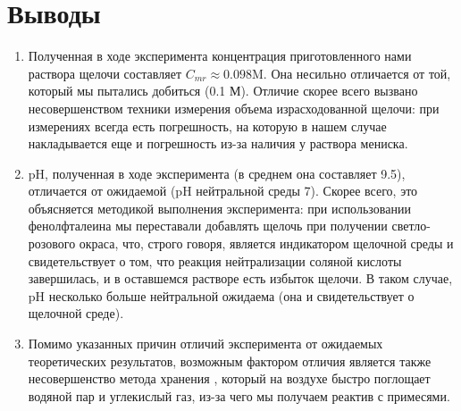 \documentclass[a4paper, 12pt]{article}
\begin{document}
\section{Выводы}

\begin{enumerate}
	\item Полученная в ходе эксперимента концентрация приготовленного нами раствора щелочи составляет $\boxed{C_{mr} \approx 0.098 \text{M}}$. Она несильно отличается от той, который мы пытались добиться (0.1 М). Отличие скорее всего вызвано несовершенством техники измерения объема израсходованной щелочи: при измерениях всегда есть погрешность, на которую в нашем случае накладывается еще и погрешность из-за наличия у раствора мениска.
	
	\item pH, полученная в ходе эксперимента (в среднем она составляет 9.5), отличается от ожидаемой (pH нейтральной среды 7). Скорее всего, это объясняется методикой выполнения эксперимента: при использовании фенолфталеина мы переставали добавлять щелочь при получении светло-розового окраса, что, строго говоря, является индикатором щелочной среды и свидетельствует о том, что реакция нейтрализации соляной кислоты завершилась, и в оставшемся растворе есть избыток щелочи. В таком случае, pH несколько больше нейтральной ожидаема (она и свидетельствует о щелочной среде).
	
	\item Помимо указанных причин отличий эксперимента от ожидаемых теоретических результатов, возможным фактором отличия является также несовершенство метода хранения , который на воздухе быстро поглощает водяной пар и углекислый газ, из-за чего мы получаем реактив с примесями.
\end{enumerate}


	
\end{document}
